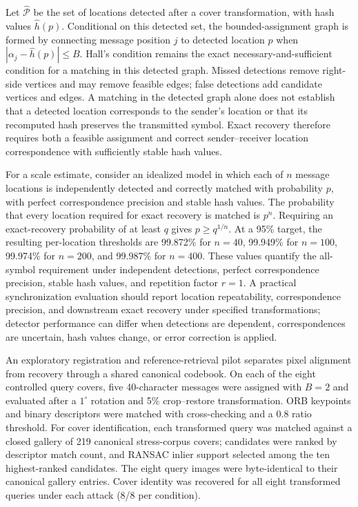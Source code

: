 \documentclass[preprint,12pt]{elsarticle}
\theoremstyle{plain}
\begin{document}
Let $\widehat{\mathcal{P}}$ be the set of locations detected after a cover
transformation, with hash values $\widehat{h}(p)$. Conditional on this
detected set, the bounded-assignment graph is formed by connecting message
position $j$ to detected location $p$ when
$|\alpha_j-\widehat{h}(p)|\leq B$. Hall's condition remains the exact
necessary-and-sufficient condition for a matching in this detected graph.
Missed detections remove right-side vertices and may remove feasible edges;
false detections add candidate vertices and edges. A matching in the detected
graph alone does not establish that a detected location corresponds to the
sender's location or that its recomputed hash preserves the transmitted
symbol. Exact recovery therefore requires both a feasible assignment and
correct sender--receiver location correspondence with sufficiently stable
hash values.

For a scale estimate, consider an idealized model in which each of $n$
message locations is independently detected and correctly matched with
probability $p$, with perfect correspondence precision and stable hash values.
The probability that every location required for exact recovery is matched is
$p^n$. Requiring an exact-recovery probability of at least $q$ gives
$p\geq q^{1/n}$. At a 95\% target, the resulting per-location thresholds are
99.872\% for $n=40$, 99.949\% for $n=100$, 99.974\% for $n=200$, and
99.987\% for $n=400$. These values quantify the all-symbol requirement under
independent detections, perfect correspondence precision, stable hash values,
and repetition factor $r=1$. A practical synchronization evaluation should report
location repeatability, correspondence precision, and downstream exact
recovery under specified transformations; detector performance can differ
when detections are dependent, correspondences are uncertain, hash values
change, or error correction is applied.

An exploratory registration and reference-retrieval pilot separates pixel
alignment from recovery through a shared canonical codebook. On each of the
eight controlled query covers, five 40-character messages were assigned with
$B=2$ and evaluated after a $1^\circ$ rotation and 5\% crop--restore
transformation. ORB keypoints and binary descriptors \cite{rublee2011orb}
were matched with cross-checking and a 0.8 ratio threshold. For cover
identification, each transformed query was matched against a closed gallery
of 219 canonical stress-corpus covers; candidates were ranked by descriptor
match count, and RANSAC inlier support selected among the ten highest-ranked
candidates. The eight query images were byte-identical to their canonical
gallery entries. Cover identity was recovered for all eight transformed
queries under each attack (8/8 per condition).
\end{document}

